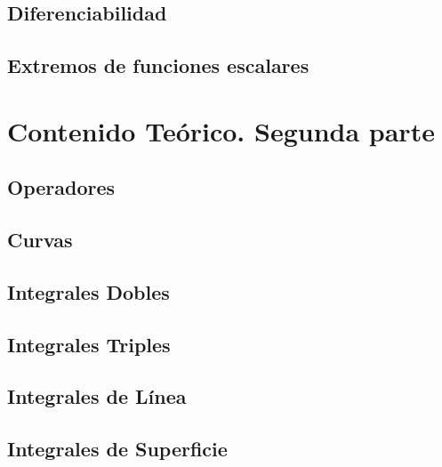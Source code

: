\documentclass[10pt, a4paper]{report}
\begin{document}
        \section{Diferenciabilidad}
            
        
        \section{Extremos de funciones escalares} 
           



    \chapter{Contenido Teórico. Segunda parte}
       \section{Operadores}
            
            
       \section{Curvas}
           
             
       \section{Integrales Dobles} 
          
       
       \section{Integrales Triples}
           
        
        \section{Integrales de L\'inea}
            
        
        \section{Integrales de Superficie}
            
      
\end{document}
